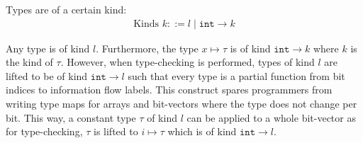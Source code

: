 Types are of a certain kind:
\begin{align*}
    \text{Kinds } k ::= l \mid \texttt{int} \rightarrow k
\end{align*}

Any type is of kind $ l $.
Furthermore, the type $ x \mapsto \tau $ is of kind $ \texttt{int} \rightarrow k $ where $ k $ is the kind of $ \tau $.
However, when type-checking is performed, types of kind $ l $ are lifted to be of kind $ \texttt{int} \rightarrow l $ such that every type is a partial function from bit indices to information flow labels.
This construct spares programmers from writing type maps for arrays and bit-vectors where the type does not change per bit.
This way, a constant type $ \tau $ of kind $ l $ can be applied to a whole bit-vector as for type-checking, $ \tau $ is lifted to $ i \mapsto \tau $ which is of kind $ \texttt{int} \rightarrow l $.

